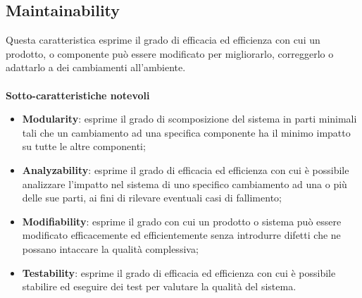 \subsection{Maintainability}
Questa caratteristica esprime il grado di efficacia ed efficienza con cui un prodotto, o componente può essere modificato per migliorarlo, correggerlo o adattarlo a dei cambiamenti all'ambiente. \\ \\
\textbf{Sotto-caratteristiche notevoli}
\begin{itemize}
	\item{\textbf{Modularity}}: esprime il grado di scomposizione del sistema in parti minimali tali che un cambiamento ad una specifica componente ha il minimo impatto su tutte le altre componenti;
	\item{\textbf{Analyzability}}: esprime il grado di efficacia ed efficienza con cui è possibile analizzare l'impatto nel sistema di uno specifico cambiamento ad una o più delle sue parti, ai fini di rilevare eventuali casi di fallimento;
	\item{\textbf{Modifiability}}: esprime il grado con cui un prodotto o sistema può essere modificato efficacemente ed efficientemente senza introdurre difetti che ne possano intaccare la qualità complessiva;
	\item{\textbf{Testability}}: esprime il grado di efficacia ed efficienza con cui è possibile stabilire ed eseguire dei test per valutare la qualità del sistema.
\end{itemize}










